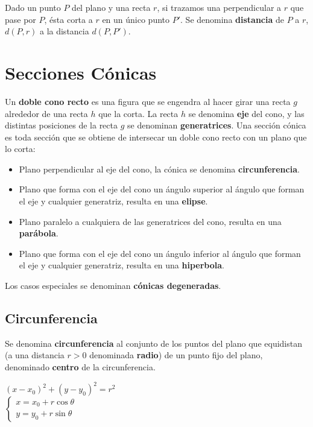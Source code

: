 \documentclass[11pt,a4paper]{article}
\begin{document}
Dado un punto $P$ del plano y una recta $r$, si trazamos una perpendicular a $r$ que pase por $P$, \'esta corta a $r$ en un \'unico punto $P'$. Se denomina \textbf{distancia} de $P$ a $r$, $d(P,r)$ a la distancia $d(P,P')$.

\section{Secciones C\'onicas}
Un \textbf{doble cono recto} es una figura que se engendra al hacer girar una recta $g$ alrededor de una recta $h$ que la corta. La recta $h$ se denomina \textbf{eje} del cono, y las distintas posiciones de la recta $g$ se denominan \textbf{generatrices}. Una secci\'on c\'onica es toda secci\'on que se obtiene de intersecar un doble cono recto con un plano que lo corta:
\begin{itemize}
\itemsep-0.3em
\item Plano perpendicular al eje del cono, la c\'onica se denomina \textbf{circunferencia}.
\item Plano que forma con el eje del cono un \'angulo superior al \'angulo que forman el eje y cualquier generatriz, resulta en una \textbf{elipse}.
\item Plano paralelo a cualquiera de las generatrices del cono, resulta en una \textbf{par\'abola}.
\item Plano que forma con el eje del cono un \'angulo inferior al \'angulo que forman el eje y cualquier generatriz, resulta en una \textbf{hiperbola}.
\end{itemize}

Los casos especiales se denominan \textbf{c\'onicas degeneradas}.

\subsection{Circunferencia}
Se denomina \textbf{circunferencia} al conjunto de los puntos del plano que equidistan (a una distancia $r>0$ denominada \textbf{radio}) de un punto fijo del plano, denominado \textbf{centro} de la circunferencia.
\begin{multicols}{2}
$(x-x_0)^2 + (y-y_0)^2 = r^2$ \\
$\left\{ \begin{array}{l} x = x_0 + r \cos \theta \\ y = y_0 + r \sin \theta \end{array} \right.$
\end{multicols}
\end{document}
